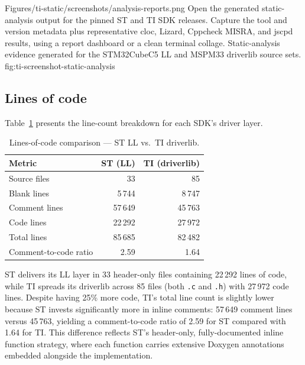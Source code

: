 \reportscreenshot
      {Figures/ti-static/screenshots/analysis-reports.png}
      {Open the generated static-analysis output for the pinned ST and TI SDK releases. Capture the tool and version metadata plus representative cloc, Lizard, Cppcheck MISRA, and jscpd results, using a report dashboard or a clean terminal collage.}
      {Static-analysis evidence generated for the STM32CubeC5 LL and MSPM33 driverlib source sets.}
      {fig:ti-screenshot-static-analysis}

\subsection{Lines of code}
\label{subsec:ti-loc}

Table~\ref{tab:ti-loc} presents the line-count breakdown for each SDK's driver layer.

\begin{table}[H]
\centering
\caption{Lines-of-code comparison --- ST LL vs.\ TI driverlib.}
\label{tab:ti-loc}
\begin{tabular}{l r r}
\toprule
\textbf{Metric} & \textbf{ST (LL)} & \textbf{TI (driverlib)} \\
\midrule
Source files      &        33 &        85 \\
Blank lines       &     5\,744 &     8\,747 \\
Comment lines     &    57\,649 &    45\,763 \\
Code lines        &    22\,292 &    27\,972 \\
\midrule
Total lines       &    85\,685 &    82\,482 \\
Comment-to-code ratio & 2.59 & 1.64 \\
\bottomrule
\end{tabular}
\end{table}

ST delivers its LL layer in 33 header-only files containing 22\,292 lines of code, while
TI spreads its driverlib across 85 files (both \texttt{.c} and \texttt{.h}) with
27\,972 code lines. Despite having 25\% more code, TI's total line count is slightly
lower because ST invests significantly more in inline comments: 57\,649 comment lines
versus 45\,763, yielding a comment-to-code ratio of 2.59 for ST compared with 1.64 for TI.
This difference reflects ST's header-only, fully-documented inline function strategy, where
each function carries extensive Doxygen annotations embedded alongside the implementation.

